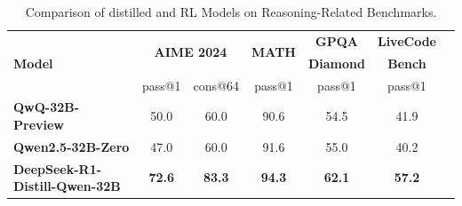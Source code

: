 \begin{table}[h]
    \centering
    \caption{Comparison of distilled and RL Models on Reasoning-Related Benchmarks.}
    \label{tab:distill_vs_rl}
            \begin{tabular}{@{}l *{6}{c} @{}}
                \toprule
                \multirow{3}{*}{\centering\textbf{Model}} & \multicolumn{2}{c}{\multirow{2}{*}{\textbf{\footnotesize{AIME 2024}}}} & \multirow{2}{*}{\textbf{\footnotesize{MATH}}} & \textbf{\footnotesize{GPQA}} & \textbf{\footnotesize{LiveCode}} \\
                    &  &  &  & \textbf{\footnotesize{Diamond}} & \textbf{\footnotesize{Bench}} \\
        \cmidrule(lr){2-3}
         & pass@1 & cons@64 & pass@1 & pass@1 & pass@1 \\
                    
                \midrule
                \textbf{QwQ-32B-Preview} 
                    & 50.0 & 60.0 & 90.6 & 54.5 & 41.9  \\
                \textbf{Qwen2.5-32B-Zero} 
                    & 47.0 & 60.0 & 91.6 & 55.0 & 40.2  \\
                \textbf{DeepSeek-R1-Distill-Qwen-32B} 
                    & \bf{72.6} & \bf{83.3} & \bf{94.3} & \bf{62.1} & \bf{57.2} \\
                \bottomrule
            \end{tabular}%
\end{table}
